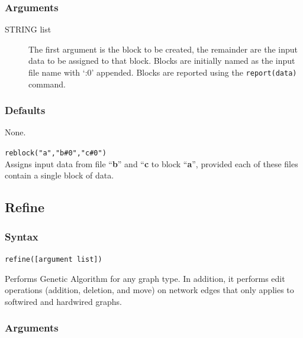 	\subsubsection{Arguments}
	\begin{description}
		\item [STRING list] The first argument is the block to be created, the remainder 
		are the input data to be assigned to that block. Blocks are initially named as the input 
		file name with `:0' appended. Blocks are reported using the \texttt{report(data)} command.
	\end{description}

	\subsubsection{Defaults}
		None.
	
	\begin{example}

		\item{\texttt{reblock("a","b\#0","c\#0")}\\ Assigns input data from file ``\textbf{b}'' and 
		``\textbf{c} to block ``\textbf{a}'', provided each of these files contain a single block 
		of data.}
	
	\end{example}

\subsection{Refine}
\label{subsec:refine}
	\subsubsection{Syntax}
		\texttt{refine([argument list])}
		
	\begin{phygdescription}
		{Performs Genetic Algorithm for any graph type. In addition, it performs edit operations 
		(addition, deletion, and move) on network edges that only applies to softwired 
		and hardwired graphs.}
	\end{phygdescription}

	\subsubsection{Arguments}
		
